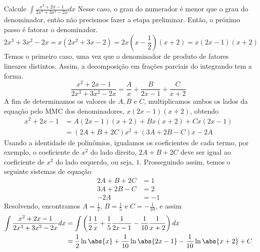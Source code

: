 \begin{example}
  Calcule \(\int \frac{x^2+2x-1}{2x^3+3x^2-2x}dx\)
  \solution
  Nesse caso, o grau do numerador é menor que o grau do denominador, então não
  precismos fazer a etapa preliminar. Então, o próximo passo é fatorar o
  denominador.
  \[
    2x^3+3x^2-2x
    = x(2x^2+3x-2)
    = 2x(x- \frac{1}{2})(x+2)
    = x(2x-1)(x+2)
  \]
  Temos o primeiro caso, uma vez que o denominador de produto de fatores
  lineares distintos. Assim, a decomposição em frações parciais do integrando
  tem a forma.
  \[
    \frac{x^2+2x-1}{2x^3+3x^2-2x}
    = \frac{A}{x}
    + \frac{B}{2x-1}
    + \frac{C}{x+2}
  \]
  A fim de determinamos os valores de $A,B$ e $C$, multiplicamos ambos os
  lados da equação pelo MMC dos denominadores, $x(2x-1)(x+2)$, obtendo
  \begin{align*}
    x^2+2x-1
    & = A(2x-1)(x+2)+Bx(x+2)+ Cx(2x-1) \\
    & = (2A+B +2C)x^2+ (3A+2B-C)x-2A
  \end{align*}
  Usando a identidade de polinômios, igualamos os coeficientes de cada termo,
  por exemplo, o coeficiente de $x^2 $ do lado direito, $2A+B +2C$ deve ser
  igual ao coeficiente de $x^2$ do lado esquerdo, ou seja, $1$. Prosseguindo
  assim, temos o seguinte sistemas de equação
  \begin{align*}
    2A+B +2C & = 1 \\
    3A+2B-C  & = 2 \\
    -2A      & =-1
  \end{align*}
  Resolvendo, encontramos
  $A= \frac{1}{2}$,
  $B= \frac{1}{5}$ e
  $C=-\frac{1}{10}$,
  e assim
  \begin{align*}
    \int \frac{x^2+2x-1}{2x^3+3x^2-2x} dx
    & = \int \left(
                \frac{1}{2}  \frac{1}{x}
              + \frac{1}{5}  \frac{1}{2x-1}
              - \frac{1}{10} \frac{1}{x+2}
             \right) dx \\
    & = \frac{1}{2}  \ln\abs{x}
      + \frac{1}{10} \ln\abs{2x-1}
      - \frac{1}{10} \ln\abs{x+2}
      + C
  \end{align*}
\end{example}

